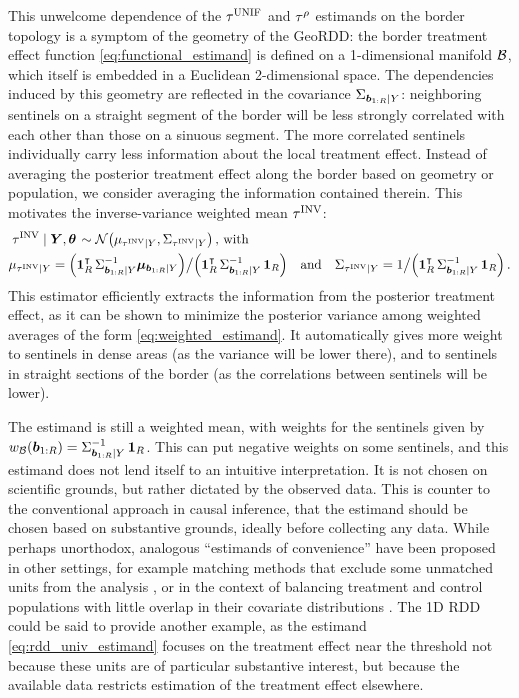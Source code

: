 This unwelcome dependence of the \(\tau^{\mathrm{UNIF}}\) and \(\tau^{\rho}\) estimands on the border topology is a symptom of the geometry of the GeoRDD: the border treatment effect function \autoref{eq:functional_estimand} is defined on a 1-dimensional manifold \(\mathcal{B}\), which itself is embedded in a Euclidean 2-dimensional space.
The dependencies induced by this geometry are reflected in the covariance \(\Sigma_{\bm{b}_{1:R} \mid Y}\): neighboring sentinels on a straight segment of the border will be less strongly correlated with each other than those on a sinuous segment.
The more correlated sentinels individually carry less information about the local treatment effect.
Instead of averaging the posterior treatment effect along the border based on geometry or population, we consider averaging the information contained therein.
This motivates the inverse-variance weighted mean \(\tau^{\mathrm{INV}}\):
\begin{equation}
    \begin{split}
        & \left. \invvar \mid \Yvec, \hyperparam \right. \sim \normal\del{\mu_{\invvar \mid Y}, \Sigma_{\invvar \mid Y}} \,\text{, with} \\
        & \mu_{\invvar \mid Y} = \del{\ones_{\numsent}\trans \Sigma_{\sentinels \mid Y}^{-1} \muvec_{\sentinels \mid Y}} \big/ \del{\ones_{\numsent}\trans \Sigma_{\sentinels \mid Y}^{-1} \ones_{\numsent}} \quad\text{and}\quad
        \Sigma_{\invvar \mid Y} = 1 \big/ \del{\ones_{\numsent}\trans \Sigma_{\sentinels \mid Y}^{-1} \ones_{\numsent}} \,.
    \end{split}
    \label{eq:invvar}
\end{equation}
This estimator efficiently extracts the information from the posterior treatment effect, as it can be shown to minimize the posterior variance among weighted averages of the form \autoref{eq:weighted_estimand}.
It automatically gives more weight to sentinels in dense areas (as the variance will be lower there), and to sentinels in straight sections of the border (as the correlations between sentinels will be lower).

The estimand is still a weighted mean, with weights for the sentinels given by \(w_{\mathcal{B}}(\bm{b}_{1:R}) = \Sigma_{\bm{b}_{1:R} \mid Y}^{-1} \operatorname{\mathbf{1}}_{R}\).
This can put negative weights on some sentinels, and this estimand does not lend itself to an intuitive interpretation.
It is not chosen on scientific grounds, but rather dictated by the observed data.
This is counter to the conventional approach in causal inference, that the estimand should be chosen based on substantive grounds, ideally before collecting any data.
While perhaps unorthodox, analogous ``estimands of convenience'' have been proposed in other settings, for example matching methods that exclude some unmatched units from the analysis \citep[discussed in][]{crump2009dealing}, or in the context of balancing treatment and control populations with little overlap in their covariate distributions \citep{li2016balancing}.
The 1D RDD could be said to provide another example, as the estimand \autoref{eq:rdd_univ_estimand} focuses on the treatment effect near the threshold not because these units are of particular substantive interest, but because the available data restricts estimation of the treatment effect elsewhere.

